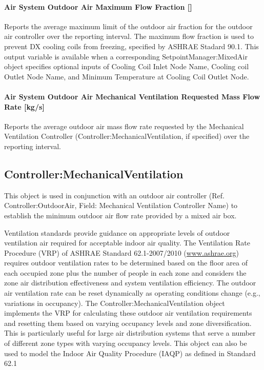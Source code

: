 \paragraph{Air System Outdoor Air Maximum Flow Fraction {[]}}\label{air-system-outdoor-air-maximum-flow-fraction}

Reports the average maximum limit of the outdoor air fraction for the outdoor air controller over the reporting interval. The maximum flow fraction is used to prevent DX cooling coils from freezing, specified by ASHRAE Stadard 90.1. This output variable is available when a corresponding SetpointManager:MixedAir object specifies optional inputs of Cooling Coil Inlet Node Name, Cooling coil Outlet Node Name, and Minimum Temperature at Cooling Coil Outlet Node.

\paragraph{Air System Outdoor Air Mechanical Ventilation Requested Mass Flow Rate {[}kg/s{]}}\label{air-system-mechvent-air-mass-flow-rate-kgs}

Reports the average outdoor air mass flow rate requested by the Mechanical Ventilation Controller (Controller:MechanicalVentilation, if specified) over the reporting interval.

\subsection{Controller:MechanicalVentilation}\label{controllermechanicalventilation}

This object is used in conjunction with an outdoor air controller (Ref. Controller:OutdoorAir, Field: Mechanical Ventilation Controller Name) to establish the minimum outdoor air flow rate provided by a mixed air box.

Ventilation standards provide guidance on appropriate levels of outdoor ventilation air required for acceptable indoor air quality. The Ventilation Rate Procedure (VRP) of ASHRAE Standard 62.1-2007/2010 (\href{http://www.ashrae.org}{www.ashrae.org}) requires outdoor ventilation rates to be determined based on the floor area of each occupied zone plus the number of people in each zone and considers the zone air distribution effectiveness and system ventilation efficiency. The outdoor air ventilation rate can be reset dynamically as operating conditions change (e.g., variations in occupancy). The Controller:MechanicalVentilation object implements the VRP for calculating these outdoor air ventilation requirements and resetting them based on varying occupancy levels and zone diversification. This is particularly useful for large air distribution systems that serve a number of different zone types with varying occupancy levels. This object can also be used to model the Indoor Air Quality Procedure (IAQP) as defined in Standard 62.1

